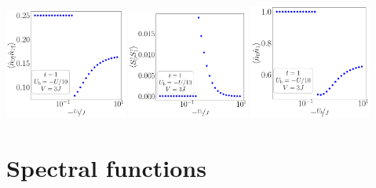 \documentclass[10pt]{report}
\numberwithin{equation}{section}
\begin{document}
\begin{center}
	\includegraphics[width=0.3\textwidth]{../figures/r-par-t=1.000,J=10.000,0.000,30,V=3J,Ubath=-U_by_10,N=6,U=1.000,889.513,30.pdf}
	\includegraphics[width=0.3\textwidth]{../figures/r-ising-t=1.000,J=10.000,0.000,30,V=3J,Ubath=-U_by_10,N=6,U=1.000,889.513,30.pdf}
	\includegraphics[width=0.3\textwidth]{../figures/r-charge-t=1.000,J=10.000,0.000,30,V=3J,Ubath=-U_by_10,N=6,U=1.000,889.513,30.pdf}
\end{center}

\section{Spectral functions}
\end{document}
